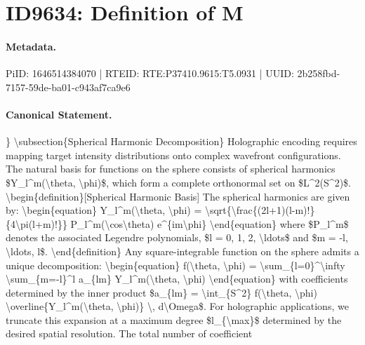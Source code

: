 \section*{ID9634: Definition of M}
\paragraph{Metadata.}
PiID: 1646514384070 | RTEID: RTE:P37410.9615:T5.0931 | UUID: 2b258fbd-7157-59de-ba01-c943af7ca9e6

\paragraph{Canonical Statement.}
\} \textbackslash{}subsection\{Spherical Harmonic Decomposition\} Holographic encoding requires mapping target intensity distributions onto complex wavefront configurations. The natural basis for functions on the sphere consists of spherical harmonics \$Y\_l\textasciicircum{}m(\textbackslash{}theta, \textbackslash{}phi)\$, which form a complete orthonormal set on \$L\textasciicircum{}2(S\textasciicircum{}2)\$. \textbackslash{}begin\{definition\}[Spherical Harmonic Basis] The spherical harmonics are given by: \textbackslash{}begin\{equation\} Y\_l\textasciicircum{}m(\textbackslash{}theta, \textbackslash{}phi) = \textbackslash{}sqrt\{\textbackslash{}frac\{(2l+1)(l-m)!\}\{4\textbackslash{}pi(l+m)!\}\} P\_l\textasciicircum{}m(\textbackslash{}cos\textbackslash{}theta) e\textasciicircum{}\{im\textbackslash{}phi\} \textbackslash{}end\{equation\} where \$P\_l\textasciicircum{}m\$ denotes the associated Legendre polynomials, \$l = 0, 1, 2, \textbackslash{}ldots\$ and \$m = -l, \textbackslash{}ldots, l\$. \textbackslash{}end\{definition\} Any square-integrable function on the sphere admits a unique decomposition: \textbackslash{}begin\{equation\} f(\textbackslash{}theta, \textbackslash{}phi) = \textbackslash{}sum\_\{l=0\}\textasciicircum{}\textbackslash{}infty \textbackslash{}sum\_\{m=-l\}\textasciicircum{}l a\_\{lm\} Y\_l\textasciicircum{}m(\textbackslash{}theta, \textbackslash{}phi) \textbackslash{}end\{equation\} with coefficients determined by the inner product \$a\_\{lm\} = \textbackslash{}int\_\{S\textasciicircum{}2\} f(\textbackslash{}theta, \textbackslash{}phi) \textbackslash{}overline\{Y\_l\textasciicircum{}m(\textbackslash{}theta, \textbackslash{}phi)\} \textbackslash{}, d\textbackslash{}Omega\$. For holographic applications, we truncate this expansion at a maximum degree \$l\_\{\textbackslash{}max\}\$ determined by the desired spatial resolution. The total number of coefficient

